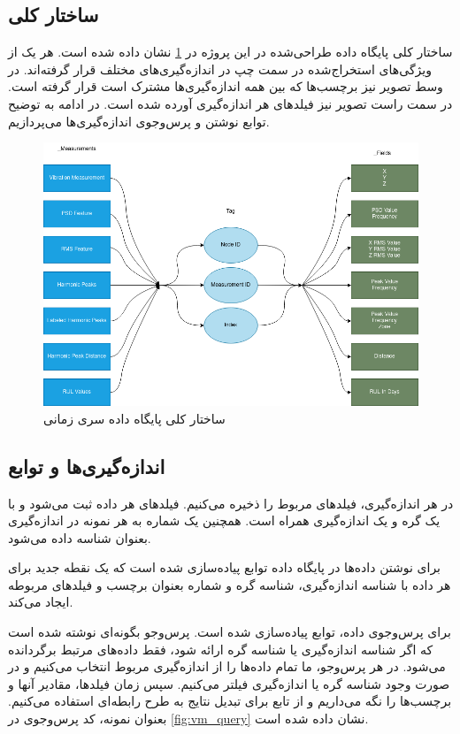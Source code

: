 \subsection{ساختار کلی}

ساختار کلی پایگاه داده طراحی‌شده در این پروژه در \cref{fig:influx_structure} نشان داده شده است. هر یک از ویژگی‌های استخراج‌شده در سمت چپ در اندازه‌گیری‌های مختلف قرار گرفته‌اند. در وسط تصویر نیز برچسب‌ها که بین همه اندازه‌گیری‌ها مشترک است قرار گرفته است. در سمت راست تصویر نیز فیلدهای هر اندازه‌گیری آورده شده است. در ادامه به توضیح توابع نوشتن و پرس‌وجوی اندازه‌گیری‌ها می‌پردازیم.


\begin{figure}[!h]
\centering\includegraphics[scale=.5]{influx_structure.png}
\caption{ساختار کلی پایگاه داده سری زمانی}\label{fig:influx_structure}
\end{figure}

\subsection{اندازه‌گیری‌ها و توابع}

در هر اندازه‌گیری، فیلدهای مربوط را ذخیره می‌کنیم. فیلدهای هر داده ثبت می‌شود و با یک گره و یک اندازه‌گیری همراه است. همچنین یک شماره به هر نمونه در اندازه‌گیری بعنوان شناسه داده می‌شود.

برای نوشتن داده‌ها در پایگاه داده توابع  پیاده‌سازی شده است که یک نقطه جدید برای هر داده با شناسه اندازه‌گیری، شناسه گره و شماره بعنوان برچسب و فیلدهای مربوطه ایجاد می‌کند.

برای پرس‌وجوی داده، توابع  پیاده‌سازی شده است. پرس‌وجو بگونه‌ای نوشته شده است که اگر شناسه اندازه‌گیری یا شناسه گره ارائه شود، فقط داده‌های مرتبط برگردانده می‌شود. در هر پرس‌وجو، ما تمام داده‌ها را از اندازه‌گیری مربوط انتخاب می‌کنیم و در صورت وجود شناسه گره یا اندازه‌گیری فیلتر می‌کنیم. سپس زمان فیلدها، مقادیر آنها و برچسب‌ها را نگه می‌داریم و از تابع  برای تبدیل نتایج به طرح رابطه‌ای استفاده می‌کنیم. بعنوان نمونه، کد پرس‌وجوی  در \cref{fig:vm_query} نشان داده شده است.

